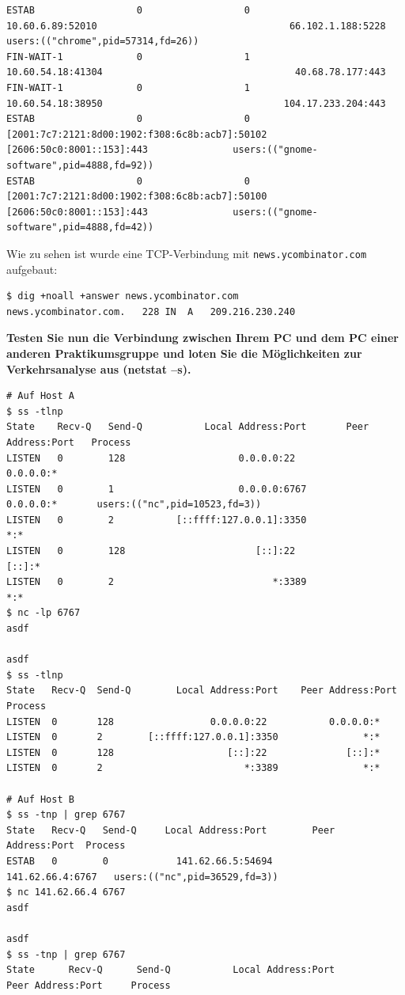 \begin{verbatim}
ESTAB                  0                  0                                                            10.60.6.89:52010                                  66.102.1.188:5228              users:(("chrome",pid=57314,fd=26))
FIN-WAIT-1             0                  1                                                           10.60.54.18:41304                                  40.68.78.177:443
FIN-WAIT-1             0                  1                                                           10.60.54.18:38950                                104.17.233.204:443
ESTAB                  0                  0                              [2001:7c7:2121:8d00:1902:f308:6c8b:acb7]:50102                         [2606:50c0:8001::153]:443               users:(("gnome-software",pid=4888,fd=92))
ESTAB                  0                  0                              [2001:7c7:2121:8d00:1902:f308:6c8b:acb7]:50100                         [2606:50c0:8001::153]:443               users:(("gnome-software",pid=4888,fd=42))
\end{verbatim}

Wie zu sehen ist wurde eine TCP-Verbindung mit
\texttt{news.ycombinator.com} aufgebaut:

\begin{verbatim}
$ dig +noall +answer news.ycombinator.com
news.ycombinator.com.   228 IN  A   209.216.230.240
\end{verbatim}

\textbf{Testen Sie nun die Verbindung zwischen Ihrem PC und dem PC einer
anderen Praktikumsgruppe und loten Sie die Möglichkeiten zur
Verkehrsanalyse aus (netstat --s).}

\begin{verbatim}
# Auf Host A
$ ss -tlnp
State    Recv-Q   Send-Q           Local Address:Port       Peer Address:Port   Process
LISTEN   0        128                    0.0.0.0:22              0.0.0.0:*
LISTEN   0        1                      0.0.0.0:6767            0.0.0.0:*       users:(("nc",pid=10523,fd=3))
LISTEN   0        2           [::ffff:127.0.0.1]:3350                  *:*
LISTEN   0        128                       [::]:22                 [::]:*
LISTEN   0        2                            *:3389                  *:*
$ nc -lp 6767
asdf

asdf
$ ss -tlnp
State   Recv-Q  Send-Q        Local Address:Port    Peer Address:Port  Process
LISTEN  0       128                 0.0.0.0:22           0.0.0.0:*
LISTEN  0       2        [::ffff:127.0.0.1]:3350               *:*
LISTEN  0       128                    [::]:22              [::]:*
LISTEN  0       2                         *:3389               *:*

# Auf Host B
$ ss -tnp | grep 6767
State   Recv-Q   Send-Q     Local Address:Port        Peer Address:Port  Process
ESTAB   0        0            141.62.66.5:54694        141.62.66.4:6767   users:(("nc",pid=36529,fd=3))
$ nc 141.62.66.4 6767
asdf

asdf
$ ss -tnp | grep 6767
State      Recv-Q      Send-Q           Local Address:Port            Peer Address:Port     Process
\end{verbatim}

